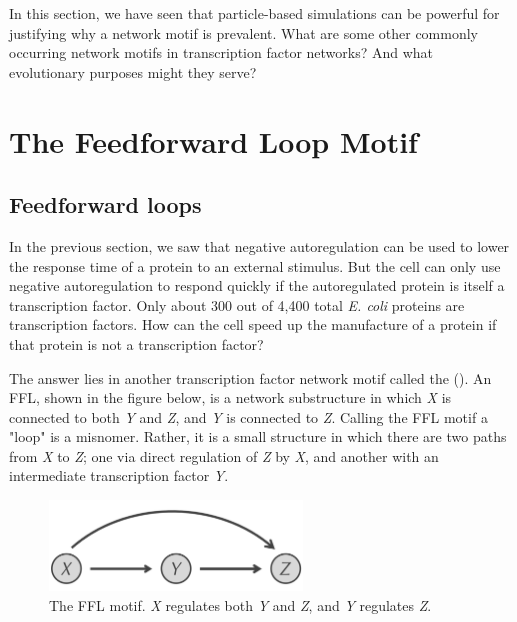 In this section, we have seen that particle-based simulations can be powerful for justifying why a network motif is prevalent. What are some other commonly occurring network motifs in transcription factor networks? And what evolutionary purposes might they serve?


\FloatBarrier
{}

\section{The Feedforward Loop Motif}
\label{sec:the_feedforward_loop_motif}

\subsection{Feedforward loops}

In the previous section, we saw that negative autoregulation can be used to lower the response time of a protein to an external stimulus. But the cell can only use negative autoregulation to respond quickly if the autoregulated protein is itself a transcription factor. Only about 300 out of 4,400 total \textit{E. coli} proteins are transcription factors. How can the cell speed up the manufacture of a protein if that protein is not a transcription factor?

The answer lies in another transcription factor network motif called the  (). An FFL, shown in the figure below, is a network substructure in which \textit{X} is connected to both \textit{Y} and \textit{Z}, and \textit{Y} is connected to \textit{Z}. Calling the FFL motif a "loop" is a misnomer. Rather, it is a small structure in which there are two paths from \textit{X} to \textit{Z}; one via direct regulation of \textit{Z} by \textit{X}, and another with an intermediate transcription factor \textit{Y}.

\begin{figure}[h]
\centering
\mySfFamily
\includegraphics[width = 0.6\textwidth]{../images/feed-forward_loop.png}
\caption{The FFL motif. \textit{X} regulates both \textit{Y} and \textit{Z}, and \textit{Y} regulates \textit{Z}.}
\label{fig:feed-forward_loop}
\end{figure}

